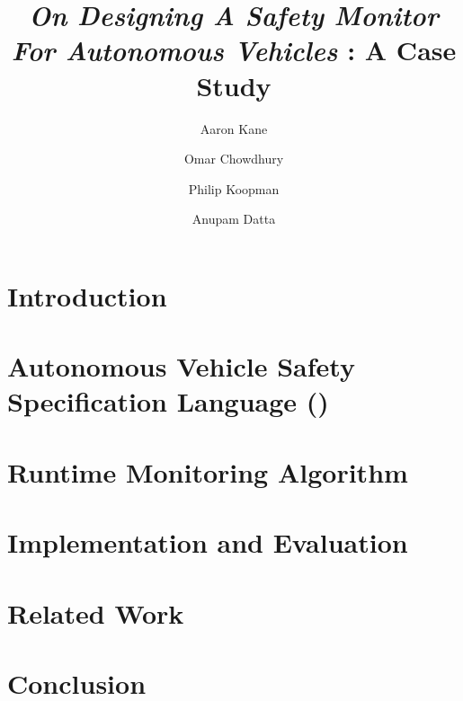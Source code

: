 \documentclass[envcountsame]{llncs}
\begin{document}
%
\frontmatter          %
%
\pagestyle{headings}  %
\mainmatter              %
\title{\emph{On Designing A Safety Monitor For Autonomous Vehicles} : A Case Study}

\author{
Aaron Kane \and Omar Chowdhury \and Philip Koopman \and Anupam Datta}
%
%

\maketitle              %



\begin{abstract}
\end{abstract}



\section{Introduction}
\label{section:introduction}




\section{Autonomous Vehicle Safety Specification Language (\planguage)}
\label{section:specificationLanguage}



\section{Runtime Monitoring Algorithm}
\label{section:algorithm}


\section{Implementation and Evaluation}
\label{section:implementation}


\section{Related Work}
\label{section:relatedWork}


\section{Conclusion}
\label{section:conclusion}




\appendix 

\end{document}
